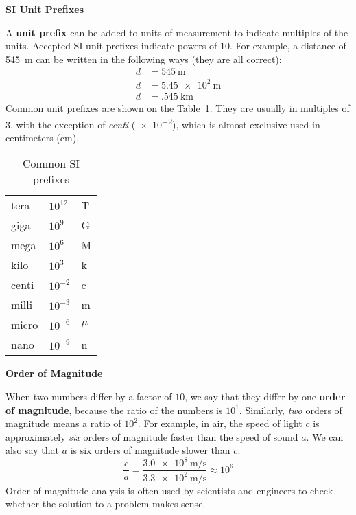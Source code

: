\documentclass{../../oss-handout}
\begin{document}
\begin{center}
  \textbf{SI Unit Prefixes}
\end{center}
A \textbf{unit prefix} can be added to units of measurement to indicate
multiples of the units. Accepted SI unit prefixes indicate powers of $10$.
For example, a distance of \SI{545}{\metre} can be written in the following
ways (they are all correct):
\begin{align*}
  d &= \SI{545}{\metre}\\
  d &= \SI{5.45e2}{\metre}\\
  d &= \SI{.545}{\kilo\metre}
\end{align*}
Common unit prefixes are shown on the Table~\ref{tabl:prefix}. They are usually
in multiples of 3, with the exception of \emph{centi} (\num{e-2}), which is
almost exclusive used in centimeters (\si{\centi\metre}).
\begin{table}[ht]
  \centering
  \begin{tabular}{lll}
    tera  & $10^{12}$ & T \\
    giga  & $10^9$  & G \\
    mega  & $10^6$  & M \\
    kilo  & $10^3$  & k \\
    centi & $10^{-2}$ & c \\
    milli & $10^{-3}$ & m \\
    micro & $10^{-6}$ & $\mu$ \\
    nano  & $10^{-9}$ & n
  \end{tabular}
  \caption{Common SI prefixes}
  \label{tabl:prefix}
\end{table}

\begin{center}
  \textbf{Order of Magnitude}
\end{center}
When two numbers differ by a factor of $10$, we say that they differ by one
\textbf{order of magnitude}, because the ratio of the numbers is $10^1$.
Similarly, \emph{two} orders of magnitude means a ratio of $10^2$. For example,
in air, the speed of light $c$ is approximately \emph{six} orders of magnitude
faster than the speed of sound $a$. We can also say that $a$ is six orders of
magnitude slower than $c$.
\begin{equation*}
  \frac ca=
  \frac{\SI{3.0e8}{\metre\per\second}}{\SI{3.3e2}{\metre\per\second}}
  \approx 10^6
\end{equation*}  
Order-of-magnitude analysis is often used by scientists and engineers to
check whether the solution to a problem makes sense.
\newpage
\end{document}
